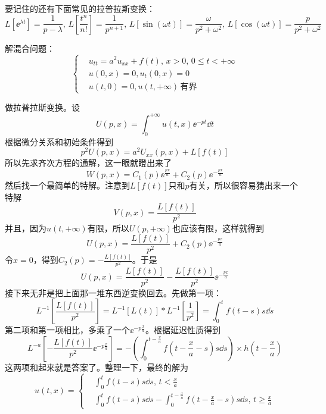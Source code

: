 要记住的还有下面常见的拉普拉斯变换：
\color{red}
\[L[\ee^{\lambda t}] = \frac{1}{p - \lambda},\, L[\frac{t^n}{n!}] = \frac{1}{p^{n+1}},\,L[\sin(\omega t)] = \frac{\omega}{p^2 + \omega^2},\, L[\cos(\omega t)] = \frac{p}{p^2 + \omega^2}\]
\color{black}
\begin{problembox}
\begin{example}
    解混合问题：
    \begin{equation*}
        \left\{
    \begin{aligned}
        &u_{tt} = a^2 u_{xx} + f\left(t\right),\, x>0, \,0 \leq t<+\infty\\
        &u(0, x) = 0, u_t(0, x) = 0\\
        &u(t, 0) = 0, u(t, +\infty)\,\text{有界}  
    \end{aligned}
    \right.
    \end{equation*}
\end{example}
\begin{solution}
做拉普拉斯变换。设
\[U(p, x) = \int_{0}^{+\infty} u(t, x) \ee^{- p t} \dd{t}\]
根据微分关系和初始条件得到
\[p^2 U(p, x) = a^2 U_{xx}(p, x) + L[f(t)]\]
所以先求齐次方程的通解，这一眼就瞪出来了
\[W(p, x) = C_1(p) \ee^{\frac{px}{a}} + C_2(p) \ee^{-\frac{px}{a}}\]
然后找一个最简单的特解。注意到$L[f(t)]$只和$p$有关，所以很容易猜出来一个特解
\[V(p, x) = \frac{L[f(t)]}{p^2}\]
并且，因为$u(t, +\infty)$有限，所以$U(p, +\infty)$也应该有限，这样就得到
\[U(p, x) = \frac{L[f(t)]}{p^2} + C_2(p) \ee^{-\frac{px}{a}}\]
令$x = 0$，得到$C_2(p) = -\frac{L[f(t)]}{p^2}$。于是
\[U(p, x) = \frac{L[f(t)]}{p^2} - \frac{L[f(t)]}{p^2} \ee^{-\frac{p x}{a}}\]
接下来无非是把上面那一堆东西逆变换回去。先做第一项：
\[L^{-1}\left[\frac{L[f(t)]}{p^2}\right] = L^{-1}[L(t)] * L^{-1}[\frac{1}{p^2}] = \int_{0}^{t} f(t - s) s \dd{s}\]
第二项和第一项相比，多乘了一个$\ee^{-p \frac{x}{a}}$。根据延迟性质得到
\[L^{-a}\left[-\frac{L[f(t)]}{p^2} \ee^{-p \frac{x}{a}}\right] = -\left(\int_{0}^{t - \frac{x}{a}} f\left(t - \frac{x}{a} - s\right) s \dd{s}\right) \times h(t - \frac{x}{a})\]
这两项和起来就是答案了。整理一下，最终的解为
\begin{equation*}
    u(t, x) = 
    \left\{
        \begin{aligned}
            &\int_{0}^{t} f(t - s) s \dd{s},\, t < \frac{x}{a}\\
            &\int_{0}^{t} f(t - s) s \dd{s} - \int_{0}^{t - \frac{x}{a}} f\left(t - \frac{x}{a} - s\right) s \dd{s},\, t \geq \frac{x}{a}
        \end{aligned}
    \right.
\end{equation*}
\end{solution}
\end{problembox}
